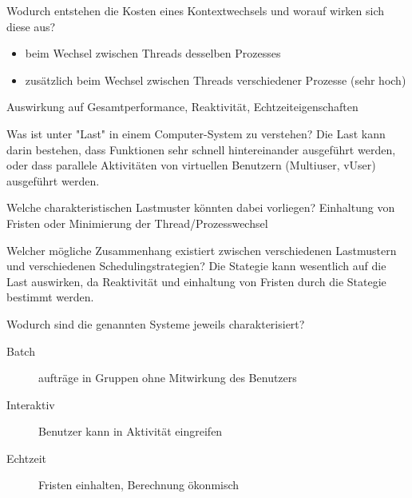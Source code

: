 \documentclass[avery5371]{flashcards}
\begin{document}
\begin{flashcard}[Kontextwechsel]{Wodurch entstehen die Kosten eines Kontextwechsels und worauf wirken sich diese aus?}
    \begin{itemize}
        \item beim Wechsel zwischen Threads desselben Prozesses
        \item zusätzlich beim Wechsel zwischen Threads verschiedener Prozesse (sehr hoch)
    \end{itemize}
    Auswirkung auf Gesamtperformance, Reaktivität, Echtzeiteigenschaften
\end{flashcard}

\begin{flashcard}{Was ist unter "Last" in einem Computer-System zu verstehen?}
    Die Last kann darin bestehen, dass Funktionen sehr schnell hintereinander ausgeführt werden, oder dass parallele Aktivitäten von virtuellen Benutzern (Multiuser, vUser) ausgeführt werden.
\end{flashcard}

\begin{flashcard}{Welche charakteristischen Lastmuster könnten dabei vorliegen?}
    Einhaltung von Fristen oder Minimierung der Thread/Prozesswechsel
\end{flashcard}

\begin{flashcard}{Welcher mögliche Zusammenhang existiert zwischen verschiedenen Lastmustern und verschiedenen Schedulingstrategien?}
    Die Stategie kann wesentlich auf die Last auswirken, da Reaktivität und einhaltung von Fristen durch die Stategie bestimmt werden.
\end{flashcard}

\begin{flashcard}{Wodurch sind die genannten Systeme jeweils charakterisiert?}
    \begin{description}
        \item[Batch] aufträge in Gruppen ohne Mitwirkung des Benutzers
        \item[Interaktiv] Benutzer kann in Aktivität eingreifen
        \item[Echtzeit] Fristen einhalten, Berechnung ökonmisch
    \end{description}
\end{flashcard}
\end{document}
